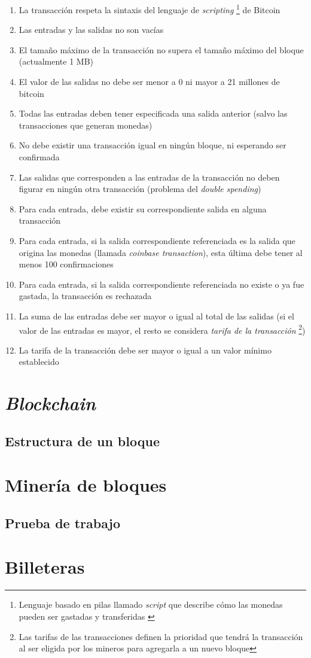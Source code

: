 \begin{enumerate}
    \item La transacción respeta la sintaxis del lenguaje de \emph{scripting} \footnote{Lenguaje basado en pilas llamado \emph{script} que describe cómo las monedas pueden ser gastadas y transferidas \autocite{MasteringBlockchainScript}} de Bitcoin 
    \item Las entradas y las salidas no son vacías
    \item El tamaño máximo de la transacción no supera el tamaño máximo del bloque (actualmente 1 MB)
    \item El valor de las salidas no debe ser menor a 0 ni mayor a 21 millones de bitcoin
    \item Todas las entradas deben tener especificada una salida anterior (salvo las transacciones que generan monedas)
    \item No debe existir una transacción igual en ningún bloque, ni esperando ser confirmada
    \item Las salidas que corresponden a las entradas de la transacción no deben figurar en ningún otra transacción (problema del \emph{double spending})
    \item Para cada entrada, debe existir su correspondiente salida en alguna transacción
    \item Para cada entrada, si la salida correspondiente referenciada es la salida que origina las monedas (llamada \emph{coinbase transaction}), esta última debe tener al menos 100 confirmaciones
    \item Para cada entrada, si la salida correspondiente referenciada no existe o ya fue gastada, la transacción es rechazada
    \item La suma de las entradas debe ser mayor o igual al total de las salidas (si el valor de las entradas es mayor, el resto se considera \emph{tarifa de la transacción} \footnote{Las tarifas de las transacciones definen la prioridad que tendrá la transacción al ser eligida por los mineros para agregarla a un nuevo bloque})
    \item La tarifa de la transacción debe ser mayor o igual a un valor mínimo establecido
\end{enumerate}

\section{\emph{Blockchain}}
\subsection{Estructura de un bloque}

\section{Minería de bloques}
\subsection{Prueba de trabajo}

\section{Billeteras}






\clearpage
\printbibliography


